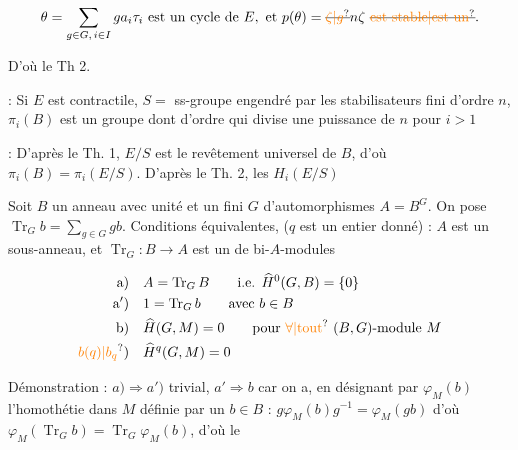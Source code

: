 \[
\theta=\sum_{g\in G,\,i\in I}ga_i\tau_i\ \text{est un cycle de } E,\ \text{et }p(\theta)=\deleted{\unsure{\zeta|g}}n\zeta\ \text{\deleted{\unsure{est stable|est un}}}.
\]

D'où le Th 2.

 : Si  $E$ est  contractile, $S={}$ ss-groupe engendré par les stabilisateurs fini d'ordre $n$, $\pi_i(B)$ est un groupe  dont  d'ordre qui divise une puissance de $n$ pour $i>1$

 :  D'après le Th. 1, $E/S$ est le revêtement universel de $B$, d'où $\pi_i(B)=\pi_i(E/S)$. D'après le Th. 2,  les $H_i(E/S)$



Soit $B$ un anneau avec unité et un  fini $G$ d'automorphismes $A=B^G$. On pose $\operatorname{Tr}_G b=\sum_{g\in G}gb$. Conditions équivalentes, ($q$ est un entier donné) : $A$ est un sous-anneau, et $\operatorname{Tr}_G:B\to A$ est un  de bi-$A$-modules


\[
\begin{aligned}
\text{a)}\quad & A=\operatorname{Tr}_G B\qquad\text{i.e. }\widehat H^0(G,B)=\{0\}\\
\text{a$'$)}\quad & 1=\operatorname{Tr}_G b\qquad\text{avec }b\in B\\
\text{b)}\quad & \widehat H(G,M)=0\qquad\text{pour }\unsure{\forall|\text{tout}}\ (B,G)\text{-module }M\\
\unsure{b(q)|b_q}\text{)}\quad & \widehat H^q(G,M)=0
\end{aligned}
\]

Démonstration : $a)\Longrightarrow a')$ trivial, $a'\Longrightarrow b$ car on a, en désignant par $\varphi_M(b)$ l'homothétie dans $M$ définie par un $b\in B$ : $g\varphi_M(b)g^{-1}=\varphi_M(gb)$ d'où $\varphi_M(\operatorname{Tr}_G b)=\operatorname{Tr}_G\varphi_M(b)$, d'où le

